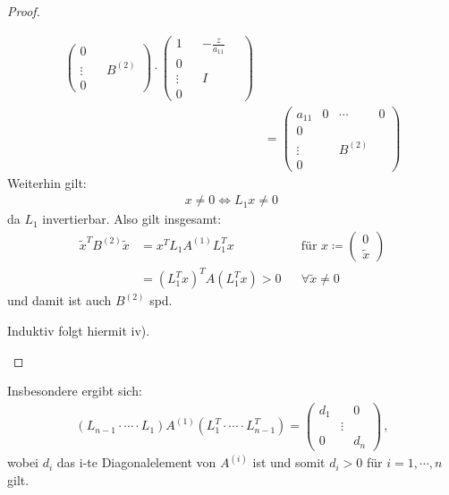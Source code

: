 \begin{proof}
\begin{enumerate}[i)]
\begin{align*}
\begin{pmatrix}
		0 \\
		\vdots && B^{(2)} \\ 
		0
              \end{pmatrix} 
      \cdot  \begin{pmatrix}
        1 &  &	-\frac{z}{a_{11}} & ~ \\ 
        0 \\
        \vdots && I \\ 
        0
      \end{pmatrix}\\
              &= \begin{pmatrix}
		a_{11} & 0 & \cdots & 0\\ 
		0 \\
		\vdots && B^{(2)} \\ 
		0
              \end{pmatrix} 
    \end{align*}
    Weiterhin gilt:
    \begin{gather*}
      x\neq 0 \Leftrightarrow L_1 x\neq 0 \,
    \end{gather*}
    da $L_1$ invertierbar. Also gilt insgesamt:
    \begin{align*}
      \widetilde{x}^TB^{(2)} \widetilde{x} &= x^T L_1A^{(1)}L_1^Tx
      &&  \text{für } x\coloneqq \begin{pmatrix}	0 \\ \widetilde{x}\end{pmatrix}\\
                                           &= (L_1^Tx)^TA(L_1^Tx) > 0
      && \forall \widetilde{x}\neq 0 
    \end{align*}
    und damit ist auch $B^{(2)}$ spd.
    
    Induktiv folgt hiermit iv).
  \end{enumerate}
\end{proof}

Insbesondere ergibt sich: 
\begin{gather*}
  (L_{n-1}\cdot \cdots\cdot L_1)A^{(1)}(L_1^T\cdot \cdots \cdot L_{n-1}^T) 
  = \begin{pmatrix} d_1 & & 0 \\ &\vdots& \\ 0&& d_n\end{pmatrix} \, ,
\end{gather*}
wobei $d_i$ das i-te Diagonalelement von $A^{(i)}$ ist und somit $d_i>0$ für $ i= 1, \cdots , n$ gilt. \\

